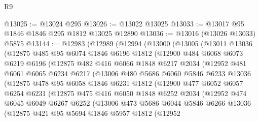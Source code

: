 \begin{lexlean}{R9}
\begin{coremodule}
@13025 := @13024 @295
@13026 := @13022 @13025
@13033 := @13017 @95 @1846 @1846 @295 @1812 @13025 @12890
@13036 := @13016 (@13026 @13033) @5875
@13144 := @12983
    (@12989
      (@12994
        (@13000
          (@13005
            (@13011
              @13036
              (@12875
                @485
                @95
                @6074
                @1846
                @6196
                @1812
                (@12900
                  @484
                  @6068
                  @6073
                  @6219
                  @6196
                  (@12875
                    @482
                    @416
                    @6066
                    @1848
                    @6217
                    @2034
                    (@12952
                      @481
                      @6061
                      @6065
                      @6234
                      @6217
                      (@13006
                        @480
                        @5686
                        @6060
                        @5846
                        @6233
                        @13036
                        (@12875
                          @478
                          @95
                          @6058
                          @1846
                          @6231
                          @1812
                          (@12900
                            @477
                            @6052
                            @6057
                            @6254
                            @6231
                            (@12875
                              @475
                              @416
                              @6050
                              @1848
                              @6252
                              @2034
                              (@12952
                                @474
                                @6045
                                @6049
                                @6267
                                @6252
                                (@13006
                                  @473
                                  @5686
                                  @6044
                                  @5846
                                  @6266
                                  @13036
                                  (@12875
                                    @421
                                    @95
                                    @5694
                                    @1846
                                    @5957
                                    @1812
                                    (@12952

\end{coremodule}
\end{lexlean}
